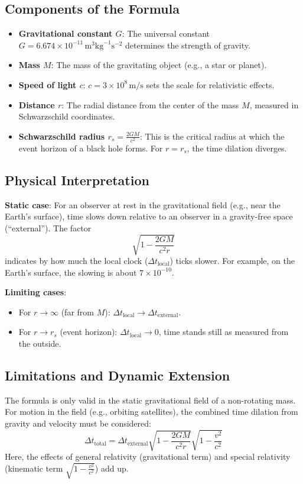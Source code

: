 \documentclass[a4paper,12pt]{article}
\begin{document}
	\subsection{Components of the Formula}
	\begin{itemize}
		\item \textbf{Gravitational constant \( G \)}: The universal constant \( G = 6.674 \times 10^{-11} \, \text{m}^3 \text{kg}^{-1} \text{s}^{-2} \) determines the strength of gravity.
		\item \textbf{Mass \( M \)}: The mass of the gravitating object (e.g., a star or planet).
		\item \textbf{Speed of light \( c \)}: \( c = 3 \times 10^8 \, \text{m/s} \) sets the scale for relativistic effects.
		\item \textbf{Distance \( r \)}: The radial distance from the center of the mass \( M \), measured in Schwarzschild coordinates.
		\item \textbf{Schwarzschild radius \( r_s = \frac{2 G M}{c^2} \)}: This is the critical radius at which the event horizon of a black hole forms. For \( r = r_s \), the time dilation diverges.
	\end{itemize}
	
	\subsection{Physical Interpretation}
	\textbf{Static case}: For an observer at rest in the gravitational field (e.g., near the Earth's surface), time slows down relative to an observer in a gravity-free space (``external''). The factor
	\[
	\sqrt{1 - \frac{2 G M}{c^2 r}}
	\]
	indicates by how much the local clock (\( \Delta t_{\text{local}} \)) ticks slower. For example, on the Earth's surface, the slowing is about \( 7 \times 10^{-10} \).
	
	\textbf{Limiting cases}:
	\begin{itemize}
		\item For \( r \to \infty \) (far from \( M \)): \( \Delta t_{\text{local}} \to \Delta t_{\text{external}} \).
		\item For \( r \to r_s \) (event horizon): \( \Delta t_{\text{local}} \to 0 \), time stands still as measured from the outside.
	\end{itemize}
	
	\subsection{Limitations and Dynamic Extension}
	The formula is only valid in the static gravitational field of a non-rotating mass. For motion in the field (e.g., orbiting satellites), the combined time dilation from gravity and velocity must be considered:
	\[
	\Delta t_{\text{total}} = \Delta t_{\text{external}} \sqrt{1 - \frac{2 G M}{c^2 r}} \sqrt{1 - \frac{v^2}{c^2}}
	\]
	Here, the effects of general relativity (gravitational term) and special relativity (kinematic term \( \sqrt{1 - \frac{v^2}{c^2}} \)) add up.
	
\end{document}
